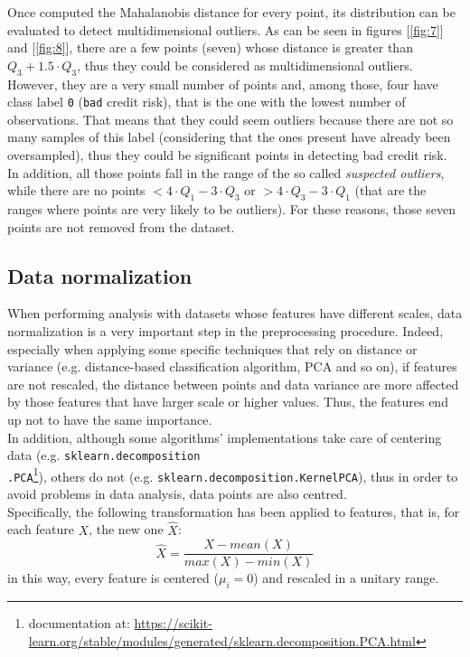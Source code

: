 \documentclass[letterpaper]{article}
\begin{document}
	Once computed the Mahalanobis distance for every point, its distribution can be evaluated to detect multidimensional outliers. As can be seen in figures [\ref{fig:7}] and [\ref{fig:8}], there are a few points (seven) whose distance is greater than $Q_3+1.5\cdot Q_3$, thus they could be considered as multidimensional outliers. However, they are a very small number of points and, among those, four have class label \texttt{0} (\texttt{bad} credit risk), that is the one with the lowest number of observations. That means that they could seem outliers because there are not so many samples of this label (considering that the ones present have already been oversampled), thus they could be significant points in detecting bad credit risk. In addition, all those points fall in the range of the so called \emph{suspected outliers}, while there are no points $< 4\cdot Q_1 - 3\cdot Q_3$ or $> 4\cdot Q_3 - 3\cdot Q_1$ (that are the ranges where points are very likely to be outliers). For these reasons, those seven points are not removed from the dataset.
	
	\subsection{Data normalization}
	When performing analysis with datasets whose features have different scales, data normalization is a very important step in the preprocessing procedure. Indeed, especially when applying some specific techniques that rely on distance or variance (e.g. distance-based classification algorithm, PCA and so on), if features are not rescaled, the distance between points and data variance are more affected by those features that have larger scale or higher values. Thus, the features end up not to have the same importance.\\
	In addition, although some algorithms' implementations take care of centering data (e.g. \texttt{sklearn.decomposition\\.PCA}\footnote{documentation at: \url{https://scikit-learn.org/stable/modules/generated/sklearn.decomposition.PCA.html}}), others do not (e.g. \texttt{sklearn.decomposition.KernelPCA}), thus in order to avoid problems in data analysis, data points are also centred.\\
	Specifically, the following transformation has been applied to features, that is, for each feature $X$, the new one $\hat{X}$:
	\begin{equation}
		\hat{X} = \frac{X - mean(X)}{max(X) - min(X)}
	\end{equation} 
	in this way, every feature is centered ($\mu_i = 0$) and rescaled in a unitary range. 
	
\end{document}
